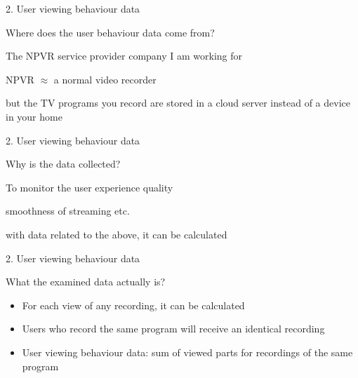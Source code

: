 \documentclass[first=orange,second=blue,logo=blueque]{aaltoslides}
\newcommand{\SubItem}[1]{
    {\setlength\itemindent{15pt} \item[$\bullet$] #1}
}
\begin{document}

\begin{frame}{2. User viewing behaviour data}
    \begin{block}{{\color{black}\alert{Where} does the user behaviour data come from?}}
        \begin{itemize}
            \item The NPVR service provider company I am working for
            \item NPVR $\approx$ a normal video recorder
                \SubItem{but the TV programs you record are stored in a cloud server instead of a device in your home}
        \end{itemize}
    \end{block}
\end{frame}


\begin{frame}{2. User viewing behaviour data}
    \begin{block}{{\color{black}\alert{Why} is the data collected?}}
        \begin{itemize}
            \item To monitor the user experience quality
                \SubItem{smoothness of streaming etc.}
                \SubItem{with data related to the above, 
                it can be calculated \color{orange}{which parts of a recording were watched during a view, and which parts were fast forwarded}}
        \end{itemize}
    \end{block}
\end{frame}


\begin{frame}{2. User viewing behaviour data}
    \begin{block}{{\color{black}\alert{What} the examined data actually is?}}
        \begin{itemize}
            \item For each view of any recording, it can be calculated
                \\ {\color{orange}{which parts of the recording were watched during a view, and which parts were fast forwarded}}
            \item Users who record the same program will receive an identical recording
            \item \alert{User viewing behaviour data}:
            sum of viewed parts for recordings of the same program
        \end{itemize}
    \end{block}
\end{frame}
\end{document}
